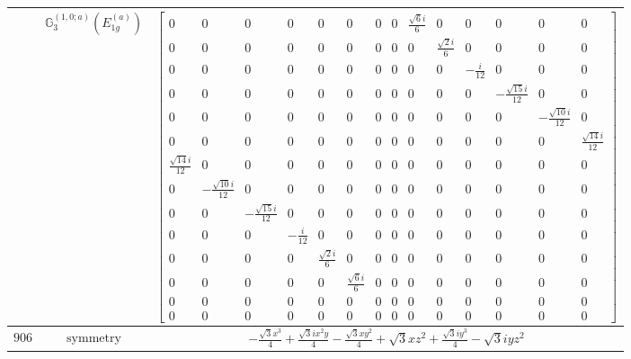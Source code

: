 \documentclass[fleqn,8pt,landscape]{jsarticle}
\begin{document}
\begin{longtable}{ccc}
$  $ & $ \mathbb{G}_{3}^{(1,0;a)}(E_{1g}^{(a)}) $ & $ \begin{bmatrix} 0 & 0 & 0 & 0 & 0 & 0 & 0 & 0 & \frac{\sqrt{6} i}{6} & 0 & 0 & 0 & 0 & 0 \\ 0 & 0 & 0 & 0 & 0 & 0 & 0 & 0 & 0 & \frac{\sqrt{2} i}{6} & 0 & 0 & 0 & 0 \\ 0 & 0 & 0 & 0 & 0 & 0 & 0 & 0 & 0 & 0 & - \frac{i}{12} & 0 & 0 & 0 \\ 0 & 0 & 0 & 0 & 0 & 0 & 0 & 0 & 0 & 0 & 0 & - \frac{\sqrt{15} i}{12} & 0 & 0 \\ 0 & 0 & 0 & 0 & 0 & 0 & 0 & 0 & 0 & 0 & 0 & 0 & - \frac{\sqrt{10} i}{12} & 0 \\ 0 & 0 & 0 & 0 & 0 & 0 & 0 & 0 & 0 & 0 & 0 & 0 & 0 & \frac{\sqrt{14} i}{12} \\ \frac{\sqrt{14} i}{12} & 0 & 0 & 0 & 0 & 0 & 0 & 0 & 0 & 0 & 0 & 0 & 0 & 0 \\ 0 & - \frac{\sqrt{10} i}{12} & 0 & 0 & 0 & 0 & 0 & 0 & 0 & 0 & 0 & 0 & 0 & 0 \\ 0 & 0 & - \frac{\sqrt{15} i}{12} & 0 & 0 & 0 & 0 & 0 & 0 & 0 & 0 & 0 & 0 & 0 \\ 0 & 0 & 0 & - \frac{i}{12} & 0 & 0 & 0 & 0 & 0 & 0 & 0 & 0 & 0 & 0 \\ 0 & 0 & 0 & 0 & \frac{\sqrt{2} i}{6} & 0 & 0 & 0 & 0 & 0 & 0 & 0 & 0 & 0 \\ 0 & 0 & 0 & 0 & 0 & \frac{\sqrt{6} i}{6} & 0 & 0 & 0 & 0 & 0 & 0 & 0 & 0 \\ 0 & 0 & 0 & 0 & 0 & 0 & 0 & 0 & 0 & 0 & 0 & 0 & 0 & 0 \\ 0 & 0 & 0 & 0 & 0 & 0 & 0 & 0 & 0 & 0 & 0 & 0 & 0 & 0 \end{bmatrix} $ \\ \hline
$ 906 $ & $ \text{symmetry} $ & $ - \frac{\sqrt{3} x^{3}}{4} + \frac{\sqrt{3} i x^{2} y}{4} - \frac{\sqrt{3} x y^{2}}{4} + \sqrt{3} x z^{2} + \frac{\sqrt{3} i y^{3}}{4} - \sqrt{3} i y z^{2} $ \\

\end{longtable}
\end{document}

